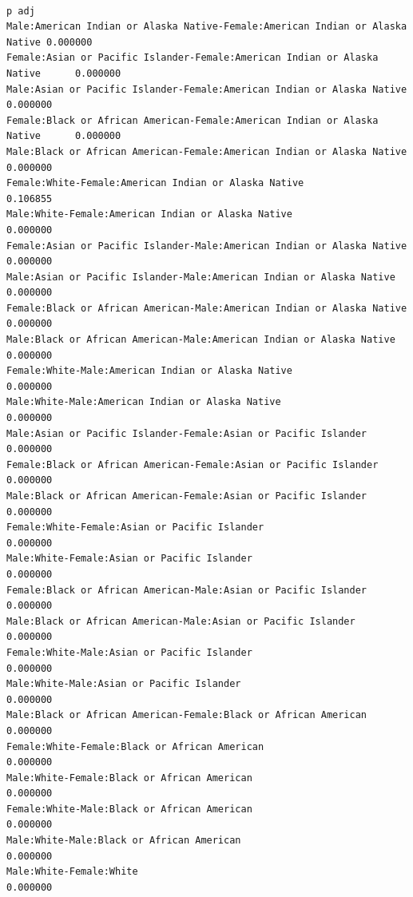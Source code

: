 \documentclass[
  letterpaper,
  DIV=11,
  numbers=noendperiod]{scrartcl}
\begin{document}
\begin{verbatim}
                                                                                 p adj
Male:American Indian or Alaska Native-Female:American Indian or Alaska Native 0.000000
Female:Asian or Pacific Islander-Female:American Indian or Alaska Native      0.000000
Male:Asian or Pacific Islander-Female:American Indian or Alaska Native        0.000000
Female:Black or African American-Female:American Indian or Alaska Native      0.000000
Male:Black or African American-Female:American Indian or Alaska Native        0.000000
Female:White-Female:American Indian or Alaska Native                          0.106855
Male:White-Female:American Indian or Alaska Native                            0.000000
Female:Asian or Pacific Islander-Male:American Indian or Alaska Native        0.000000
Male:Asian or Pacific Islander-Male:American Indian or Alaska Native          0.000000
Female:Black or African American-Male:American Indian or Alaska Native        0.000000
Male:Black or African American-Male:American Indian or Alaska Native          0.000000
Female:White-Male:American Indian or Alaska Native                            0.000000
Male:White-Male:American Indian or Alaska Native                              0.000000
Male:Asian or Pacific Islander-Female:Asian or Pacific Islander               0.000000
Female:Black or African American-Female:Asian or Pacific Islander             0.000000
Male:Black or African American-Female:Asian or Pacific Islander               0.000000
Female:White-Female:Asian or Pacific Islander                                 0.000000
Male:White-Female:Asian or Pacific Islander                                   0.000000
Female:Black or African American-Male:Asian or Pacific Islander               0.000000
Male:Black or African American-Male:Asian or Pacific Islander                 0.000000
Female:White-Male:Asian or Pacific Islander                                   0.000000
Male:White-Male:Asian or Pacific Islander                                     0.000000
Male:Black or African American-Female:Black or African American               0.000000
Female:White-Female:Black or African American                                 0.000000
Male:White-Female:Black or African American                                   0.000000
Female:White-Male:Black or African American                                   0.000000
Male:White-Male:Black or African American                                     0.000000
Male:White-Female:White                                                       0.000000
\end{verbatim}
\end{document}
